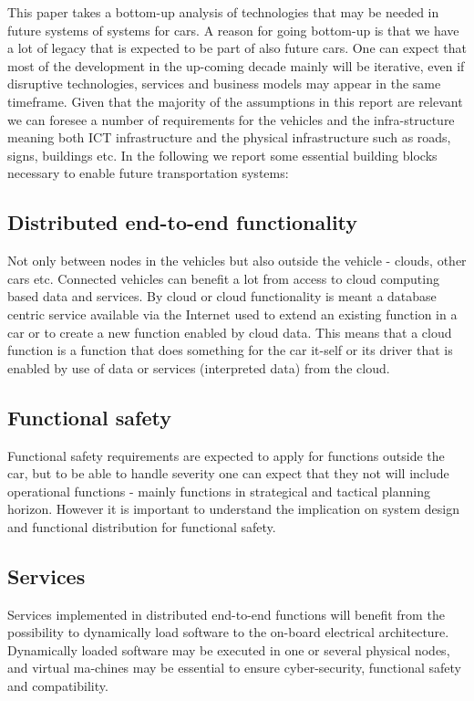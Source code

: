 \documentclass{llncs}
\begin{document}
This paper takes a bottom-up analysis of technologies that may be needed in future systems of systems for cars. A reason for going bottom-up is that we have a lot of legacy that is expected to be part of also future cars. One can expect that most of the development in the up-coming decade mainly will be iterative, even if disruptive technologies, services and business models may appear in the same timeframe. Given that the majority of the assumptions in this report are relevant we can foresee a number of requirements for the vehicles and the infra-structure meaning both ICT infrastructure and the physical infrastructure such as roads, signs, buildings etc. In the following we report some essential building blocks necessary to enable future transportation systems:

\subsection*{Distributed end-to-end functionality} 

Not only between nodes in the vehicles but also outside the vehicle - clouds, other cars etc. Connected vehicles can benefit a lot from access to cloud computing based data and services. By cloud or cloud functionality is meant a database centric service available via the Internet used to extend an existing function in a car or to create a new function enabled by cloud data. This means that a cloud function is a function that does something for the car it-self or its driver that is enabled by use of data or services (interpreted data) from the cloud.

\subsection*{Functional safety} 

Functional safety requirements are expected to apply for functions outside the car, but to be able to handle severity one can expect that they not will include operational functions - mainly functions in strategical and tactical planning horizon. However it is important to understand the implication on system design and functional distribution for functional safety. 

\subsection*{Services} 

Services implemented in distributed end-to-end functions will benefit from the possibility to dynamically load software to the on-board electrical architecture. Dynamically loaded software may be executed in one or several physical nodes, and virtual ma-chines may be essential to ensure cyber-security, functional safety and compatibility. 
\end{document}
